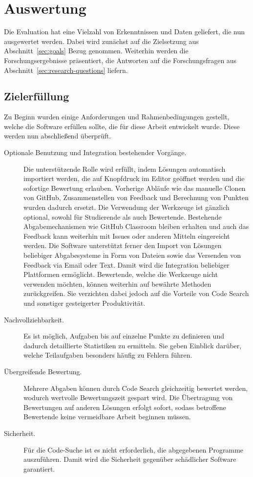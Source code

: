 \chapter{Auswertung}\label{ch:results}

Die Evaluation hat eine Vielzahl von Erkenntnissen und Daten geliefert, die nun ausgewertet werden.
Dabei wird zunächst auf die Zielsetzung aus Abschnitt~\ref{sec:goals} Bezug genommen.
Weiterhin werden die Forschungsergebnisse präsentiert, die Antworten auf die Forschungsfragen aus Abschnitt~\ref{sec:research-questions} liefern.

\section{Zielerfüllung}\label{sec:goals-reached}

Zu Beginn wurden einige Anforderungen und Rahmenbedingungen gestellt, welche die Software erfüllen sollte, die für diese Arbeit entwickelt wurde.
Diese werden nun abschließend überprüft.

\begin{description}
    \item[Optionale Benutzung und Integration bestehender Vorgänge.]
    Die unterstützende Rolle wird erfüllt, indem Lösungen automatisch importiert werden, die auf Knopfdruck im Editor geöffnet werden und die sofortige Bewertung erlauben.
    Vorherige Abläufe wie das manuelle Clonen von GitHub, Zusammenstellen von Feedback und Berechnung von Punkten wurden dadurch ersetzt.
    Die Verwendung der Werkzeuge ist gänzlich optional, sowohl für Studierende als auch Bewertende.
    Bestehende Abgabemechanismen wie GitHub Classroom bleiben erhalten und auch das Feedback kann weiterhin mit Issues oder anderen Mitteln eingereicht werden.
    Die Software unterstützt ferner den Import von Lösungen beliebiger Abgabesysteme in Form von Dateien sowie das Versenden von Feedback via Email oder Text.
    Damit wird die Integration beliebiger Plattformen ermöglicht.
    Bewertende, welche die Werkzeuge nicht verwenden möchten, können weiterhin auf bewährte Methoden zurückgreifen.
    Sie verzichten dabei jedoch auf die Vorteile von Code Search und sonstiger gesteigerter Produktivität.
    \item[Nachvollziehbarkeit.]
    Es ist möglich, Aufgaben bis auf einzelne Punkte zu definieren und dadurch detaillierte Statistiken zu ermitteln.
    Sie geben Einblick darüber, welche Teilaufgaben besonders häufig zu Fehlern führen.
    \item[Übergreifende Bewertung.]
    Mehrere Abgaben können durch Code Search gleichzeitig bewertet werden, wodurch wertvolle Bewertungszeit gespart wird.
    Die Übertragung von Bewertungen auf anderen Lösungen erfolgt sofort, sodass betroffene Bewertende keine vermeidbare Arbeit beginnen müssen.
    \item[Sicherheit.]
    Für die Code-Suche ist es nicht erforderlich, die abgegebenen Programme auszuführen.
    Damit wird die Sicherheit gegenüber schädlicher Software garantiert.
\end{description}

